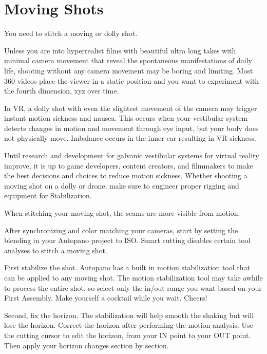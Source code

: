 \chapter{Moving Shots}
\pagecolor{white}
\label{chap:45}
\begin{fullwidth}

\problem

{\large You need to stitch a moving or dolly shot. \par}

Unless you are into hyperrealist films with beautiful ultra long takes with minimal camera movement that reveal the spontaneous manifestations of daily life, shooting without any camera movement may be boring and limiting. Most 360 videos place the viewer in a static position and you want to experiment with the fourth dimension, xyz over time.

In VR, a dolly shot with even the slightest movement of the camera may trigger instant motion sickness and nausea. This occurs when your vestibular system detects changes in motion and movement through eye input, but your body does not physically move. Imbalance occurs in the inner ear resulting in VR sickness. 

Until research and development for galvanic vestibular systems for virtual reality improve, it is up to game developers, content creators, and filmmakers to make the best decisions and choices to reduce motion sickness. Whether shooting a moving shot on a dolly or drone, make sure to engineer proper rigging and equipment for Stabilization. 

When stitching your moving shot, the seams are more visible from motion.

\clearpage
\solution

After synchronizing and color matching your cameras, start by setting the blending in your Autopano project to ISO. Smart cutting disables certain tool analyses to stitch a moving shot. 


First stabilize the shot. Autopano has a built in motion stabilization tool that can be applied to any moving shot. The motion stabilization tool may take awhile to process the entire shot, so select only the in/out range you want based on your First Assembly. Make yourself a cocktail while you wait. Cheers!

\clearpage
Second, fix the horizon. The stabilization will help smooth the shaking but will lose the horizon. Correct the horizon after performing the motion analysis. Use the cutting cursor to edit the horizon, from your IN point to your OUT point. Then apply your horizon changes section by section.


\end{fullwidth}
